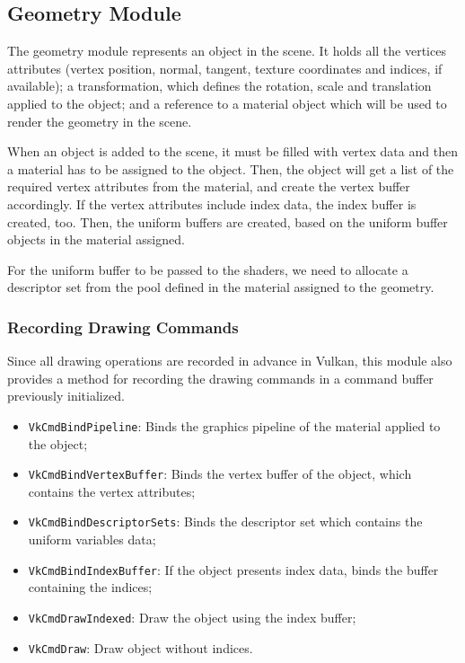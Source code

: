 \subsection{Geometry Module}
The geometry module represents an object in the scene. It holds all the vertices attributes (vertex position, normal, tangent, texture coordinates and indices, if available); a transformation, which defines the rotation, scale and translation applied to the object; and a reference to a material object which will be used to render the geometry in the scene.

When an object is added to the scene, it must be filled with vertex data and then a material has to be assigned to the object. Then, the object will get a list of the required vertex attributes from the material, and create the vertex buffer accordingly. If the vertex attributes include index data, the index buffer is created, too. Then, the uniform buffers are created, based on the uniform buffer objects in the material assigned.

For the uniform buffer to be passed to the shaders, we need to allocate a descriptor set from the pool defined in the material assigned to the geometry.

\subsubsection{Recording Drawing Commands}
Since all drawing operations are recorded in advance in Vulkan, this module also provides a method for recording the drawing commands in a command buffer previously initialized.

\begin{itemize}
    \item \texttt{VkCmdBindPipeline}: Binds the graphics pipeline of the material applied to the object;
    \item \texttt{VkCmdBindVertexBuffer}: Binds the vertex buffer of the object, which contains the vertex attributes;
    \item \texttt{VkCmdBindDescriptorSets}: Binds the descriptor set which contains the uniform variables data;
    \item \texttt{VkCmdBindIndexBuffer}: If the object presents index data, binds the buffer containing the indices;
    \item \texttt{VkCmdDrawIndexed}: Draw the object using the index buffer;
    \item \texttt{VkCmdDraw}: Draw object without indices.
\end{itemize}

